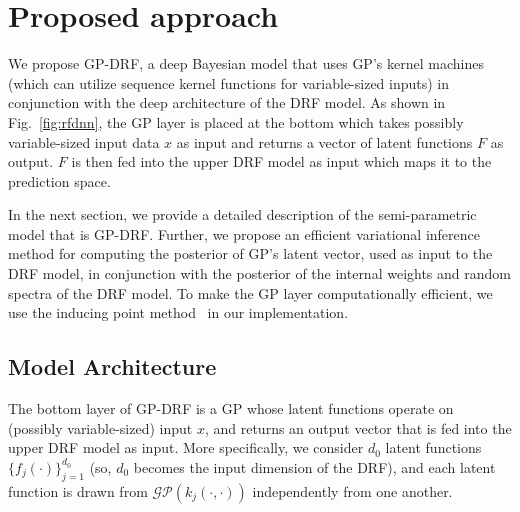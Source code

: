 \documentclass[conference]{IEEEtran}
\begin{document}
\section{Proposed approach}\label{sec:ours}


 
We propose GP-DRF, a deep Bayesian model that uses GP's kernel machines (which can utilize sequence kernel functions for variable-sized inputs) in conjunction with the deep architecture of the DRF model. As shown in Fig.~\ref{fig:rfdnn},  the GP layer is placed at the bottom which takes possibly variable-sized input data $x$ as input and returns a vector of latent functions $F$ as output. $F$ is then fed into the upper DRF model as input which maps it to the prediction space.  

In the next section, we provide a detailed description of the semi-parametric model that is GP-DRF. Further, we propose an efficient variational inference method for computing the posterior of GP's latent vector, used as input to the DRF model, in conjunction with the posterior of the internal weights and random spectra of the DRF model. To make the GP layer computationally efficient, we use the inducing point method~\cite{dai2015variational} in our implementation.


\subsection{Model Architecture}\label{sec:model}

The bottom layer of GP-DRF is a GP whose latent functions operate on 
(possibly variable-sized) input $x$, and returns an output vector that is fed into the 
upper DRF model as input. More specifically, we consider $d_0$ latent 
functions $\{f_j(\cdot)\}_{j=1}^{d_0}$ (so, $d_0$ becomes the input dimension 
of the DRF), and each latent function is drawn from $\mathcal{GP}(k_j(\cdot,\cdot))$ 
independently from one another.  
\end{document}
